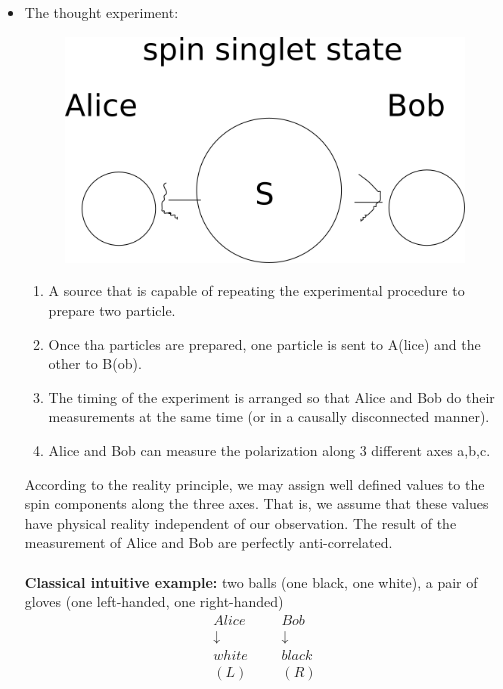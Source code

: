 \documentclass[]{article}
\newtheorem*{remark}{Remark}
\theoremstyle{nonumberplain}
\begin{document}
\begin{itemize}
\begin{remark}
\end{remark}
	\item The thought experiment:
\begin{figure}[h]
	\centering
	\includegraphics[scale = 0.3]{graph/3.png}
\end{figure}
\begin{enumerate}
	\item A source  that is capable of repeating the experimental procedure to prepare two particle.
	\item Once tha particles are prepared, one particle is sent to A(lice) and the other to B(ob).
	\item The timing of the experiment is arranged so that Alice and Bob do their measurements at the same time (or in a causally disconnected manner). 
	\item Alice and Bob can measure the polarization along 3 different axes a,b,c.
\end{enumerate}
According to the reality principle, we may assign well defined values to the spin components along the three axes. That is, we assume that these values have physical reality independent of our observation. The result of the measurement of Alice and Bob are perfectly anti-correlated.\\
\\
\textbf{Classical intuitive example:} two balls (one black, one white), a pair of gloves (one left-handed, one right-handed)
\begin{equation*}
\begin{aligned}
	Alice &&& Bob \\
	\downarrow &&& \downarrow \\ 
	white &&& black \\
	(L) &&& (R) \\
\end{aligned}

\end{equation*}
\end{itemize}
\end{document}
